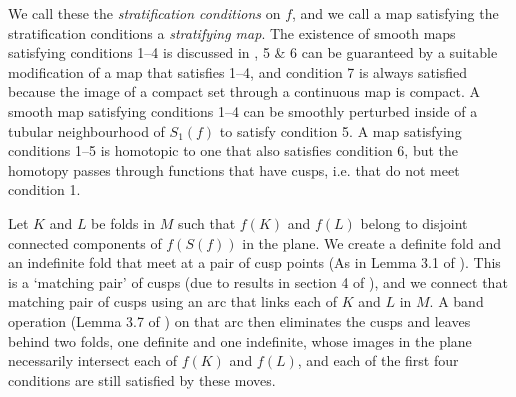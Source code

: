 We call these the \emph{stratification conditions} on $f$, and we call a map satisfying the stratification conditions a \emph{stratifying map}.
The existence of smooth maps satisfying conditions 1--4 is discussed in \cite{Levine65}, 5 \& 6 can be guaranteed by a suitable modification of a map that satisfies 1--4, and condition 7 is always satisfied because the image of a compact set through a continuous map is compact.
A smooth map satisfying conditions 1--4 can be smoothly perturbed inside of a tubular neighbourhood of $S_1(f)$ to satisfy condition 5.
A map satisfying conditions 1--5 is homotopic to one that also satisfies condition 6, but the homotopy passes through functions that have cusps, i.e. that do not meet condition 1.

Let $K$ and $L$ be folds in $M$ such that $f(K)$ and $f(L)$ belong to disjoint connected components of $f(S(f))$ in the plane.
We create a definite fold and an indefinite fold that meet at a pair of cusp points (As in Lemma 3.1 of \cite{saeki1995constructing}).
This is a `matching pair' of cusps (due to results in section 4 of \cite{Levine65}), and we connect that matching pair of cusps using an arc that links each of $K$ and $L$ in $M$.
A band operation (Lemma 3.7 of \cite{saeki1995constructing}) on that arc then eliminates the cusps and leaves behind two folds, one definite and one indefinite, whose images in the plane necessarily intersect each of $f(K)$ and $f(L)$, and each of the first four conditions are still satisfied by these moves.

